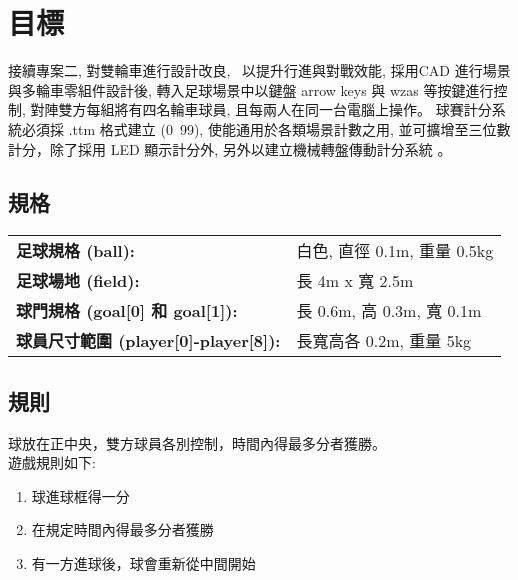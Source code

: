 \chapter{目標}
接續專案二, 對雙輪車進行設計改良,  以提升行進與對戰效能, 採用CAD 進行場景與多輪車零組件設計後, 轉入足球場景中以鍵盤 arrow keys 與 wzas 等按鍵進行控制, 對陣雙方每組將有四名輪車球員, 且每兩人在同一台電腦上操作。
球賽計分系統必須採 .ttm 格式建立 (0~99), 使能通用於各類場景計數之用, 並可擴增至三位數計分，除了採用 LED 顯示計分外, 另外以建立機械轉盤傳動計分系統 。

\section{規格}
\begin{tabular}{p{4cm}p{6cm}}
  \textbf{足球規格 (ball):} & 白色, 直徑 0.1m, 重量 0.5kg \\
  \textbf{足球場地 (field):} & 長 4m x 寬 2.5m \\
  \textbf{球門規格 (goal[0] 和 goal[1]):} & 長 0.6m, 高 0.3m, 寬 0.1m \\
  \textbf{球員尺寸範圍 (player[0]-player[8]):} & 長寬高各 0.2m, 重量 5kg \\
\end{tabular}

\section{規則}
球放在正中央，雙方球員各別控制，時間內得最多分者獲勝。 \\
遊戲規則如下: \\
\begin{enumerate}[label=\textbullet]
\item 球進球框得一分 \\
\item 在規定時間內得最多分者獲勝 \\
\item 有一方進球後，球會重新從中間開始 \\
\end{enumerate}
